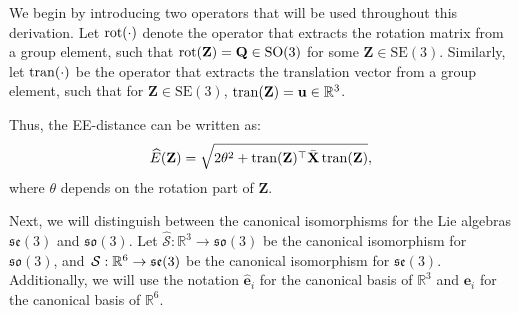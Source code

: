 We begin by introducing two operators that will be used throughout this derivation. Let $\operatorname{rot}(\cdot)$ denote the operator that extracts the rotation matrix from a group element, such that $\operatorname{rot}(\mathbf{Z})=\mathbf{Q}\in\text{SO}(3)$ for some $\mathbf{Z}\in\text{SE}(3)$. Similarly, let $\operatorname{tran}(\cdot)$ be the operator that extracts the translation vector from a group element, such that for $\mathbf{Z}\in\text{SE}(3)$, $\operatorname{tran}(\mathbf{Z})=\mathbf{u}\in\mathbb{R}^3$. 

Thus, the EE-distance can be written as:
\begin{align}
    \widehat{E}(\mathbf{Z}) = \sqrt{2\theta^2 + \operatorname{tran}(\mathbf{Z})^\top\bar{\mathbf{X}}\operatorname{tran}(\mathbf{Z})},
\end{align}
where $\theta$ depends on the rotation part of $\mathbf{Z}$.

Next, we will distinguish between the canonical isomorphisms for the Lie algebras $\mathfrak{se}(3)$ and $\mathfrak{so}(3)$. Let $\widehat{\mathcal{S}}:\mathbb{R}^3\to\mathfrak{so}(3)$ be the canonical isomorphism for $\mathfrak{so}(3)$, and $\SL:\mathbb{R}^6\to\mathfrak{se}(3)$ be the canonical isomorphism for $\mathfrak{se}(3)$. Additionally, we will use the notation $\widehat{\mathbf{e}}_i$ for the canonical basis of $\mathbb{R}^3$ and $\mathbf{e}_i$ for the canonical basis of $\mathbb{R}^6$.


